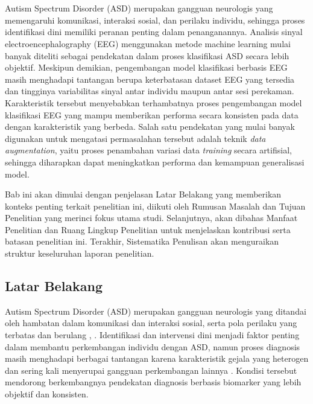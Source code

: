 \chapter{\babSatu}
\label{Pendahuluan}
Autism Spectrum Disorder (ASD) merupakan gangguan neurologis yang memengaruhi komunikasi, interaksi sosial, dan perilaku individu, sehingga proses identifikasi dini memiliki peranan penting dalam penanganannya. Analisis sinyal electroencephalography (EEG) menggunakan metode machine learning mulai banyak diteliti sebagai pendekatan dalam proses klasifikasi ASD secara lebih objektif. Meskipun demikian, pengembangan model klasifikasi berbasis EEG masih menghadapi tantangan berupa keterbatasan dataset EEG yang tersedia dan tingginya variabilitas sinyal antar individu maupun antar sesi perekaman. Karakteristik tersebut menyebabkan terhambatnya proses pengembangan model klasifikasi EEG yang mampu memberikan performa secara konsisten pada data dengan karakteristik yang berbeda. Salah satu pendekatan yang mulai banyak digunakan untuk mengatasi permasalahan tersebut adalah teknik \textit{data augmentation}, yaitu proses penambahan variasi data \textit{training} secara artifisial, sehingga diharapkan dapat meningkatkan performa dan kemampuan generalisasi model.

Bab ini akan dimulai dengan penjelasan Latar Belakang yang memberikan konteks penting terkait penelitian ini, diikuti oleh Rumusan Masalah dan Tujuan Penelitian yang merinci fokus utama studi. Selanjutnya, akan dibahas Manfaat Penelitian dan Ruang Lingkup Penelitian untuk menjelaskan kontribusi serta batasan penelitian ini. Terakhir, Sistematika Penulisan akan menguraikan struktur keseluruhan laporan penelitian.

\section{Latar Belakang}
\label{sec:latar_belakang}

Autism Spectrum Disorder (ASD) merupakan gangguan neurologis yang ditandai oleh hambatan dalam komunikasi dan interaksi sosial, serta pola perilaku yang terbatas dan berulang \cite{nih_autism}, \cite{dsm5}. Identifikasi dan intervensi dini menjadi faktor penting dalam membantu perkembangan individu dengan ASD, namun proses diagnosis masih menghadapi berbagai tantangan karena karakteristik gejala yang heterogen dan sering kali menyerupai gangguan perkembangan lainnya \cite{autism_diagnosis_challenges} \cite{10423494}. Kondisi tersebut mendorong berkembangnya pendekatan diagnosis berbasis biomarker yang lebih objektif dan konsisten.

